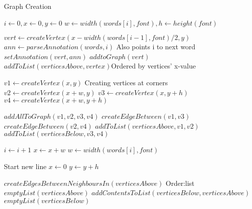 \documentclass{article}
\begin{document}
\begin{algorithm}
\caption{Graph Creation}\label{euclid}
\begin{algorithmic}[1]
 \State $i \gets 0, x \gets 0, y \gets 0$
 \State $w \gets width(words[i],font), h \gets height(font)$
 \item[]
 
   \State $vert \gets createVertex(x-width(words[i-1],font)/2,y)$
   \State $ann \gets parseAnnotation(words,i)$ \Comment Also points i to next word
   \State $setAnnotation(vert,ann)$ 
   \State $addtoGraph(vert)$ 
   \State $addToList(verticesAbove,vertex)$\Comment Ordered by vertices' x-value
   \item[] 
   
  \Else
   \State $v1 \gets createVertex(x,y)$ \Comment Creating vertices at corners
   \State $v2 \gets createVertex(x+w,y)$
   \State $v3 \gets createVertex(x,y+h)$
   \State $v4 \gets createVertex(x+w,y+h)$
   \item[]
   
   \State $addAllToGraph(v1,v2,v3,v4)$
   \State $createEdgeBetween(v1,v3)$
   \State $createEdgeBetween(v2,v4)$
   \State $addToList(verticesAbove,v1,v2)$
   \State $addToList(verticesBelow,v3,v4)$
   \item[]
   
  \EndIf
  \State $i \gets i+1$
  \State $x \gets x+w$
  \State $w \gets width(words[i],font)$
  \item[]
  
   \Comment Start new line
    \State $x \gets 0$
    \State $y \gets y+h$
    \item[]
    
    \State $createEdgesBetweenNeighboursIn(verticesAbove)$ \Comment Order:list
    \State $emptyList(verticesAbove)$
    \State $addContentsToList(verticesBelow, verticesAbove)$ 
    \State $emptyList(verticesBelow)$
  \EndIf
 \EndWhile
\EndProcedure
\end{algorithmic}
\end{algorithm}
\end{document}
